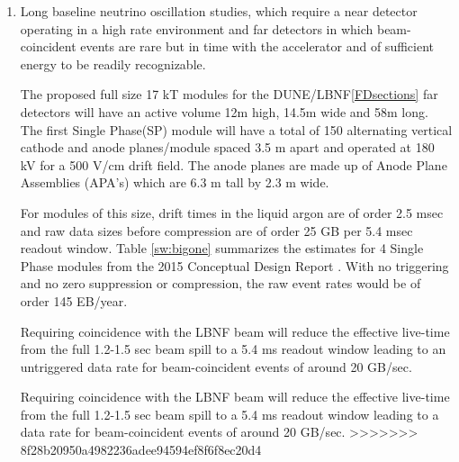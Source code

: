 \begin{enumerate}
\item Long baseline neutrino oscillation studies, which require a near detector operating in a high rate environment and far detectors in which beam-coincident events are rare but in time with the accelerator and of sufficient energy to be readily recognizable.  

The proposed  full size 17 kT modules for the DUNE/LBNF\ref{FDsections} far detectors will  have an active volume 12m high, 14.5m wide and 58m long.  The first Single Phase(SP) module will have 
a total of 150 alternating vertical cathode and anode planes/module  spaced 3.5 m apart and operated at 180 kV for a 500 V/cm drift field.  The anode planes are made up of Anode Plane Assemblies  (APA's) which are 6.3 m tall by 2.3 m wide. %

For modules of this size, drift times in the liquid argon are of order 2.5 msec and raw data sizes before compression are of order 25 GB per 5.4 msec readout window. Table \ref{sw:bigone} summarizes the estimates for 4 Single Phase modules from the 2015 Conceptual Design Report \cite{cdr-annex-rates}.  With no triggering and no zero suppression or compression, the raw event rates would be of order 145 EB/year. 

Requiring  coincidence with the LBNF beam will reduce the effective live-time from the full 1.2-1.5 sec beam spill to a 5.4 ms readout window leading to an untriggered data rate for beam-coincident events of around 20 GB/sec.


Requiring  coincidence with the LBNF beam will reduce the effective live-time from the full 1.2-1.5 sec beam spill to a 5.4 ms readout window leading to a data rate for beam-coincident events of around 20 GB/sec.
>>>>>>> 8f28b20950a4982236adee94594ef8f6f8ec20d4


\end{enumerate}
